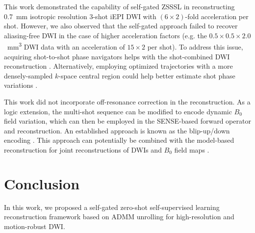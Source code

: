 \documentclass[journal,twoside,web]{ieeecolor}
\begin{document}
	This work demonstrated the capability of self-gated ZSSSL in
	reconstructing \SI{0.7}{mm} isotropic resolution 3-shot iEPI DWI
	with $(6 \times 2)$-fold acceleration per shot.
	However, we also observed that the self-gated approach
	failed to recover aliasing-free DWI
	in the case of higher acceleration factors
	(e.g. the $0.5\times0.5\times2.0$~\si{mm^3} DWI data
	with an acceleration of $15\times2$ per shot).
	To address this issue, acquiring shot-to-shot phase navigators 
	helps with the shot-combined DWI reconstruction \cite{tan_2024_naviepi}.
	Alternatively, employing optimized trajectories
	with a more densely-sampled $k$-space central region
	could help better estimate shot phase variations
	\cite{liu_2004_diff_spiral,dai_2023_epti-diff}.

	

	This work did not incorporate off-resonance correction in the reconstruction.
	As a logic extension, the multi-shot sequence can be modified
	to encode dynamic $B_0$ field variation, which can then be employed in the SENSE-based forward operator and reconstruction. An established approach
	is known as the blip-up/down encoding \cite{zahneisen_2017_blipud}.
	This approach can potentially be combined with the model-based reconstruction
	for joint reconstructions of DWIs and $B_0$ field maps \cite{tan_2022_meco}.

	\section{Conclusion}

	In this work, we proposed a self-gated zero-shot self-supervised learning
	reconstruction framework based on ADMM unrolling
	for high-resolution and motion-robust DWI.




	
	
\end{document}
